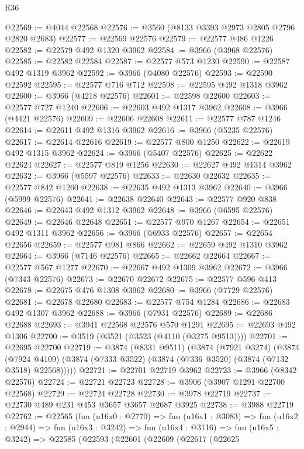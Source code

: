 \begin{lexlean}{R36}
\begin{coremodule}
@22569 := @4044 @22568
@22576 := @3560 (@8133 @3393 @2973 @2805 @2796 @2820 @2683)
@22577 := @22569 @22576
@22579 := @22577 @486 @1226
@22582 := @22579 @492 @1320 @3962
@22584 := @3966 (@3968 @22576)
@22585 := @22582 @22584
@22587 := @22577 @573 @1230
@22590 := @22587 @492 @1319 @3962
@22592 := @3966 (@4080 @22576)
@22593 := @22590 @22592
@22595 := @22577 @716 @712
@22598 := @22595 @492 @1318 @3962
@22600 := @3966 (@4218 @22576)
@22601 := @22598 @22600
@22603 := @22577 @727 @1240
@22606 := @22603 @492 @1317 @3962
@22608 := @3966 (@4421 @22576)
@22609 := @22606 @22608
@22611 := @22577 @787 @1246
@22614 := @22611 @492 @1316 @3962
@22616 := @3966 (@5235 @22576)
@22617 := @22614 @22616
@22619 := @22577 @800 @1250
@22622 := @22619 @492 @1315 @3962
@22624 := @3966 (@5407 @22576)
@22625 := @22622 @22624
@22627 := @22577 @819 @1256
@22630 := @22627 @492 @1314 @3962
@22632 := @3966 (@5597 @22576)
@22633 := @22630 @22632
@22635 := @22577 @842 @1260
@22638 := @22635 @492 @1313 @3962
@22640 := @3966 (@5999 @22576)
@22641 := @22638 @22640
@22643 := @22577 @920 @838
@22646 := @22643 @492 @1312 @3962
@22648 := @3966 (@6595 @22576)
@22649 := @22646 @22648
@22651 := @22577 @970 @1267
@22654 := @22651 @492 @1311 @3962
@22656 := @3966 (@6933 @22576)
@22657 := @22654 @22656
@22659 := @22577 @981 @866
@22662 := @22659 @492 @1310 @3962
@22664 := @3966 (@7146 @22576)
@22665 := @22662 @22664
@22667 := @22577 @567 @1277
@22670 := @22667 @492 @1309 @3962
@22672 := @3966 (@7343 @22576)
@22673 := @22670 @22672
@22675 := @22577 @596 @413
@22678 := @22675 @476 @1308 @3962
@22680 := @3966 (@7729 @22576)
@22681 := @22678 @22680
@22683 := @22577 @754 @1284
@22686 := @22683 @492 @1307 @3962
@22688 := @3966 (@7931 @22576)
@22689 := @22686 @22688
@22693 := @3941 @22568 @22576 @570 @1291
@22695 := @22693 @492 @1306
@22700 := @3519 (@3521 (@3523 (@4110 (@3275 @9513))))
@22701 := @22695 @22700
@22719 := @3874
    (@8331 @9511)
    (@3874
      (@7921 @3274)
      (@3874
        (@7924 @4109)
        (@3874 (@7333 @3522) (@3874 (@7336 @3520) (@3874 (@7132 @3518) @22568)))))
@22721 := @22701 @22719 @3962
@22723 := @3966 (@8342 @22576)
@22724 := @22721 @22723
@22728 := @3906 (@3907 @1291 @22700 @22568)
@22729 := @22724 @22728
@22730 := @3978 @22719
@22737 := @22730 @489 @231 @453 @3657 @3657 @2687 @3925
@22738 := @3988 @22719
@22762 := @22565
    (fun (u16x0 : @2770) =>
    fun (u16x1 : @3083) =>
    fun (u16x2 : @2944) =>
    fun (u16x3 : @3242) =>
    fun (u16x4 : @3116) =>
    fun (u16x5 : @3242) =>
    @22585
      (@22593
        (@22601
          (@22609
            (@22617
              (@22625

\end{coremodule}
\end{lexlean}
